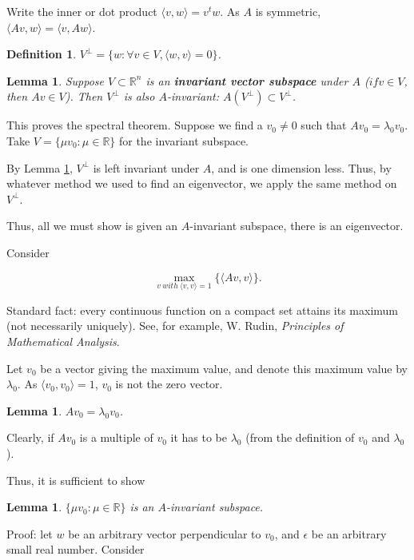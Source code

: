 \documentclass[12pt,letterpaper]{report}
\newcommand\be{\begin{equation}}
\newcommand\ee{\end{equation}}
\newcommand{\R}{\ensuremath{\mathbb{R}}}
\newtheorem{lem}[thm]{Lemma}
\newtheorem{defi}[thm]{Definition}
\begin{document}
Write the inner or dot product $\langle v, w\rangle = v^t w$. As
$A$ is symmetric, $\langle Av, w\rangle = \langle v, Aw \rangle$.

\begin{defi} $V^\bot = \{w: \forall v \in V, \langle w,v \rangle =
0\}$. \end{defi}

\begin{lem}\label{leminvsubspace} Suppose $V \subset \R^n$ is an \textbf{invariant vector
subspace} under $A$ ($if v \in V$, then $Av \in V$). Then $V^\bot$
is also $A$-invariant: $A(V^\bot) \subset V^\bot$. \end{lem}

This proves the spectral theorem. Suppose we find a $v_0 \neq 0$
such that $Av_0 = \lambda_0 v_0$. Take $V = \{\mu v_0: \mu \in \R
\}$ for the invariant subspace.

By Lemma \ref{leminvsubspace}, $V^\bot$ is left invariant under
$A$, and is one dimension less. Thus, by whatever method we used
to find an eigenvector, we apply the same method on $V^\bot$.

Thus, all we must show is given an $A$-invariant subspace, there
is an eigenvector.

Consider

\be \max_{v \ with \ \langle v, v\rangle = 1} \Big\{ \langle Av,
v\rangle \Big\}. \ee

Standard fact: every continuous function on a compact set attains
its maximum (not necessarily uniquely). See, for example, W.
Rudin, \emph{Principles of Mathematical Analysis}.

Let $v_0$ be a vector giving the maximum value, and denote this
maximum value by $\lambda_0$. As $\langle v_0,v_0\rangle = 1$,
$v_0$ is not the zero vector.

\begin{lem} $Av_0 = \lambda_0 v_0$. \end{lem}

Clearly, if $Av_0$ is a multiple of $v_0$ it has to be $\lambda_0$
(from the definition of $v_0$ and $\lambda_0$).

Thus, it is sufficient to show

\begin{lem} $\{\mu v_0: \mu \in \R \}$ is an $A$-invariant
subspace. \end{lem}

Proof: let $w$ be an arbitrary vector perpendicular to $v_0$, and
$\epsilon$ be an arbitrary small real number. Consider
\end{document}
